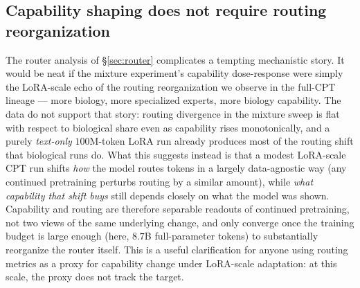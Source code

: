 \subsection{Capability shaping does not require routing reorganization}
The router analysis of \S\ref{sec:router} complicates a tempting mechanistic story. It would be
neat if the mixture experiment's capability dose-response were simply the LoRA-scale echo of the
routing reorganization we observe in the full-CPT lineage --- more biology, more specialized
experts, more biology capability. The data do not support that story: routing divergence in the
mixture sweep is flat with respect to biological share even as capability rises monotonically,
and a purely \emph{text-only} $100$M-token LoRA run already produces most of the routing shift
that biological runs do. What this suggests instead is that a modest LoRA-scale CPT run shifts
\emph{how} the model routes tokens in a largely data-agnostic way (any continued pretraining
perturbs routing by a similar amount), while \emph{what capability that shift buys} still
depends closely on what the model was shown. Capability and routing are therefore separable
readouts of continued pretraining, not two views of the same underlying change, and only
converge once the training budget is large enough (here, $8.7$B full-parameter tokens) to
substantially reorganize the router itself. This is a useful clarification for anyone using
routing metrics as a proxy for capability change under LoRA-scale adaptation: at this scale, the
proxy does not track the target.

